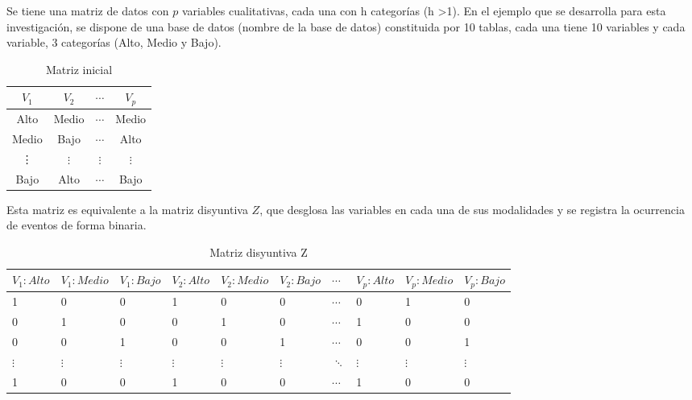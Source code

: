 \documentclass[water,article,submit,moreauthors,pdftex]{mdpi}
\begin{document}
Se tiene una matriz de datos con \(p\) variables cualitativas, cada una
con h categorías (h \textgreater1). En el ejemplo que se desarrolla para
esta investigación, se dispone de una base de datos (nombre de la base
de datos) constituida por 10 tablas, cada una tiene 10 variables y cada
variable, 3 categorías (Alto, Medio y Bajo).

\begin{table}[!ht]
\begin{center}
 \begin{tabular}{||c c c c||} 
 \hline
 $V_{1}$ & $V_{2}$ & $\cdots$ & $V_{p}$ \\ [0.5ex] 
 \hline\hline
 Alto & Medio & $\cdots$ & Medio\\
 \hline
Medio & Bajo & $\cdots$ & Alto\\
\hline
\vdots & $\vdots$ & $\vdots$ & $\vdots$\\
\hline
Bajo & Alto & $\cdots$ & Bajo \\ [1ex] 
 \hline
\end{tabular}\caption{Matriz inicial}
\label{tab:inicial}
\end{center}
\end{table}

Esta matriz es equivalente a la matriz disyuntiva \(Z\), que desglosa
las variables en cada una de sus modalidades y se registra la ocurrencia
de eventos de forma binaria.

\begin{table}[!ht]
\begin{center}
 \begin{tabular}{||p{1cm}p{1cm}p{1cm}||p{1cm}p{1cm} p{1cm} ||p{1cm} ||p{1cm} p{1cm} p{1cm} ||} 
 \hline
 $V_{1}:Alto$ &$V_{1}:Medio$ &$V_{1}:Bajo$ & $V_{2}:Alto$ & $V_{2}:Medio$ & $V_{2}:Bajo$ & $\cdots$ & $V_{p}:Alto$ & $V_{p}:Medio$ & $V_{p}:Bajo$ \\ [0.5ex] 
 \hline\hline
 1 & 0 & 0 & 1 & 0 & 0 & $\cdots$ & 0 & 1 & 0 \\ [0.2ex] 
 \hline
 0 & 1 & 0 & 0 & 1 & 0 & $\cdots$ & 1 & 0 & 0 \\ 
\hline
 0 & 0 & 1 & 0 & 0 &  1 & $\cdots$ & 0 & 0 & 1 \\ 
\hline
 $\vdots$ & $\vdots$ & $\vdots$ & $\vdots$ & $\vdots$ &  $\vdots$ & $\ddots$ & $\vdots$ & $\vdots$ & $\vdots$ \\ 
\hline
 1 & 0 & 0 & 1 & 0 & 0 & $\cdots$ &1 & 0 & 0 \\  
 \hline
\end{tabular}
\caption{Matriz disyuntiva Z}
\label{tab:z}
\end{center}
\end{table}
\end{document}
